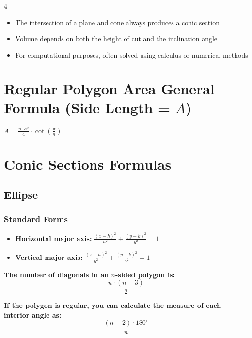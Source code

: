 \begin{multicols*}{4}
\begin{itemize}
    \item The intersection of a plane and cone always produces a conic section
    \item Volume depends on both the height of cut and the inclination angle
    \item For computational purposes, often solved using calculus or numerical methods
\end{itemize}

\section*{Regular Polygon Area General Formula (Side Length = $A$)}

\noindent$A = \frac{n \cdot a^2}{4} \cdot \cot\left(\frac{\pi}{n}\right)$





\section*{Conic Sections Formulas}

\subsection*{Ellipse}

\subsubsection*{Standard Forms}
\begin{itemize}
    \item \textbf{Horizontal major axis:} $\frac{(x-h)^2}{a^2} + \frac{(y-k)^2}{b^2} = 1$
    \item \textbf{Vertical major axis:} $\frac{(x-h)^2}{b^2} + \frac{(y-k)^2}{a^2} = 1$
\end{itemize}









\textbf{\small The number of diagonals in an $n$-sided polygon is:}
\[
\frac{n \cdot (n - 3)}{2}
\]

\textbf{\small If the polygon is regular, you can calculate the measure of each interior angle as:}
\[
\frac{(n - 2) \cdot 180^\circ}{n}
\]


















\end{multicols*}
